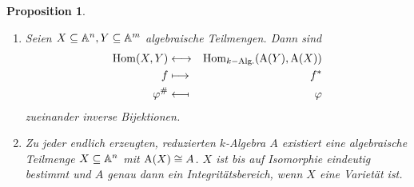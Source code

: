 \documentclass[12pt,a4paper]{scrartcl}
\theoremstyle{cplain}
\newtheorem{prop}[thmcounter]{Proposition}
\theoremstyle{cdef}
\begin{document}
\begin{prop} \label{prop:8.27}
	\leavevmode
	\begin{enumerate}
		\item Seien $X\subseteq \mathbb A^n, Y\subseteq \mathbb A^m$ algebraische Teilmengen. Dann sind
		\begin{eqnarray*}
			\operatorname{Hom}(X,Y) & \longleftrightarrow & \operatorname{Hom}_{k-\text{Alg.}}(\operatorname{A}(Y),\operatorname{A}(X))\\
			f & \longmapsto &f^*\\
			\varphi^{\#}&\longmapsfrom & \varphi
		\end{eqnarray*}
		zueinander inverse Bijektionen. \label{prop:8.27:i}
		\item Zu jeder endlich erzeugten, reduzierten $k$-Algebra $A$ existiert eine algebraische Teilmenge $X\subseteq \mathbb A^n$ mit $\operatorname{A}(X)\cong A$. $X$ ist bis auf Isomorphie eindeutig bestimmt und $A$ genau dann ein Integritätsbereich, wenn $X$ eine Varietät ist. \label{prop:8.27:ii}
	\end{enumerate}
\end{prop}
\end{document}
